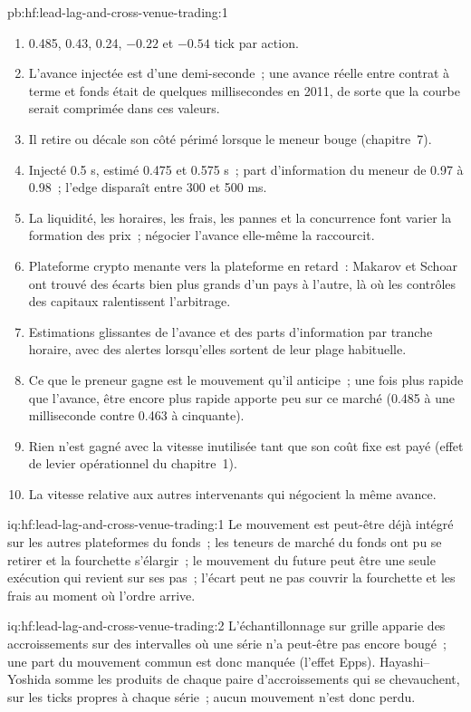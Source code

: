 \begin{solution}{pb:hf:lead-lag-and-cross-venue-trading:1}
\begin{enumerate}
\item 0.485, 0.43, 0.24, $-0.22$ et $-0.54$ tick par action.
\item L'avance injectée est d'une demi-seconde~; une avance réelle entre contrat à terme et fonds était de quelques millisecondes en 2011, de sorte que la courbe serait comprimée dans ces valeurs.
\item Il retire ou décale son côté périmé lorsque le meneur bouge (chapitre~7).
\item Injecté 0.5 s, estimé 0.475 et 0.575 s~; part d'information du meneur de 0.97 à 0.98~; l'edge disparaît entre 300 et 500 ms.
\item La liquidité, les horaires, les frais, les pannes et la concurrence font varier la formation des prix~; négocier l'avance elle-même la raccourcit.
\item Plateforme crypto menante vers la plateforme en retard~: Makarov et Schoar ont trouvé des écarts bien plus grands d'un pays à l'autre, là où les contrôles des capitaux ralentissent l'arbitrage.
\item Estimations glissantes de l'avance et des parts d'information par tranche horaire, avec des alertes lorsqu'elles sortent de leur plage habituelle.
\item Ce que le preneur gagne est le mouvement qu'il anticipe~; une fois plus rapide que l'avance, être encore plus rapide apporte peu sur ce marché (0.485 à une
milliseconde contre 0.463 à cinquante).
\item Rien n'est gagné avec la vitesse inutilisée tant que son coût fixe est payé (effet de levier opérationnel du chapitre~1).
\item La vitesse relative aux autres intervenants qui négocient la même avance.
\end{enumerate}
\end{solution}

\begin{solution}{iq:hf:lead-lag-and-cross-venue-trading:1}
Le mouvement est peut-être déjà intégré sur les autres plateformes du fonds~; les teneurs de marché du fonds ont pu se retirer et la fourchette s'élargir~; le mouvement du future
peut être une seule exécution qui revient sur ses pas~; l'écart peut ne pas couvrir la fourchette et les frais au moment où l'ordre arrive.
\end{solution}

\begin{solution}{iq:hf:lead-lag-and-cross-venue-trading:2}
L'échantillonnage sur grille apparie des accroissements sur des intervalles où une série n'a peut-être pas encore bougé~; une part du mouvement commun est donc manquée (l'effet Epps).
Hayashi--Yoshida somme les produits de chaque paire d'accroissements qui se chevauchent, sur les ticks propres à chaque série~; aucun mouvement n'est donc perdu.
\end{solution}

